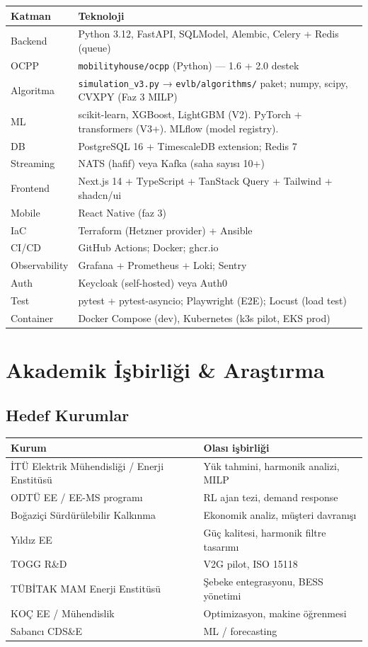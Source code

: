 \documentclass[11pt,a4paper]{article}
\begin{document}
\begin{tabularx}{\textwidth}{l X}
\toprule
\textbf{Katman} & \textbf{Teknoloji} \\
\midrule
Backend & Python 3.12, FastAPI, SQLModel, Alembic, Celery + Redis (queue) \\
OCPP & \texttt{mobilityhouse/ocpp} (Python) — 1.6 + 2.0 destek \\
Algoritma & \texttt{simulation\_v3.py} → \texttt{evlb/algorithms/} paket; numpy, scipy, CVXPY (Faz 3 MILP) \\
ML & scikit-learn, XGBoost, LightGBM (V2). PyTorch + transformers (V3+). MLflow (model registry). \\
DB & PostgreSQL 16 + TimescaleDB extension; Redis 7 \\
Streaming & NATS (hafif) veya Kafka (saha sayısı 10+) \\
Frontend & Next.js 14 + TypeScript + TanStack Query + Tailwind + shadcn/ui \\
Mobile & React Native (faz 3) \\
IaC & Terraform (Hetzner provider) + Ansible \\
CI/CD & GitHub Actions; Docker; ghcr.io \\
Observability & Grafana + Prometheus + Loki; Sentry \\
Auth & Keycloak (self-hosted) veya Auth0 \\
Test & pytest + pytest-asyncio; Playwright (E2E); Locust (load test) \\
Container & Docker Compose (dev), Kubernetes (k3s pilot, EKS prod) \\
\bottomrule
\end{tabularx}

\section{Akademik İşbirliği \& Araştırma}

\subsection{Hedef Kurumlar}

\begin{tabularx}{\textwidth}{l X}
\toprule
\textbf{Kurum} & \textbf{Olası işbirliği} \\
\midrule
İTÜ Elektrik Mühendisliği / Enerji Enstitüsü & Yük tahmini, harmonik analizi, MILP \\
ODTÜ EE / EE-MS programı & RL ajan tezi, demand response \\
Boğaziçi Sürdürülebilir Kalkınma & Ekonomik analiz, müşteri davranışı \\
Yıldız EE & Güç kalitesi, harmonik filtre tasarımı \\
TOGG R\&D & V2G pilot, ISO 15118 \\
TÜBİTAK MAM Enerji Enstitüsü & Şebeke entegrasyonu, BESS yönetimi \\
KOÇ EE / Mühendislik & Optimizasyon, makine öğrenmesi \\
Sabancı CDS\&E & ML / forecasting \\
\bottomrule
\end{tabularx}
\end{document}
